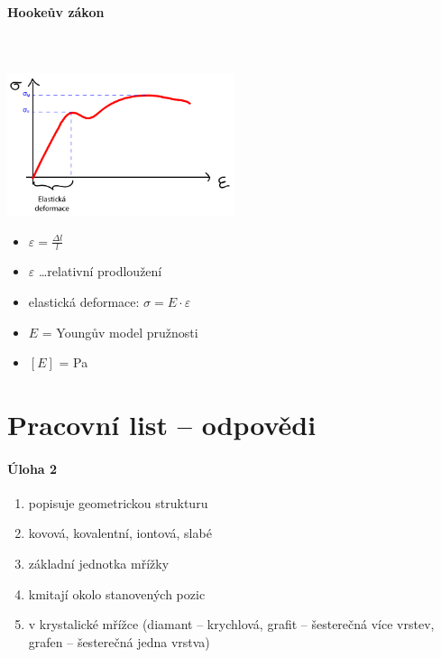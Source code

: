 \paragraph{Hookeův zákon} \mbox{} \\ \mbox{} \\
\includegraphics[width=0.5\textwidth]{pictures/005.png}
\begin{itemize}
\item $\varepsilon = \frac{\Delta l}{l}$
\item $\varepsilon$ \ldots relativní prodloužení
\item elastická deformace: $\sigma = E \cdot \varepsilon$
\item $E$ = Youngův model pružnosti
\item $[E]$ = Pa
\end{itemize}

\newpage
\section{Pracovní list -- odpovědi}
\paragraph{Úloha 2}
\begin{enumerate}
\item popisuje geometrickou strukturu
\item kovová, kovalentní, iontová, slabé
\item základní jednotka mřížky
\item kmitají okolo stanovených pozic
\item v krystalické mřížce (diamant -- krychlová, grafit -- šesterečná více vrstev, grafen -- šesterečná jedna vrstva)
\end{enumerate}

